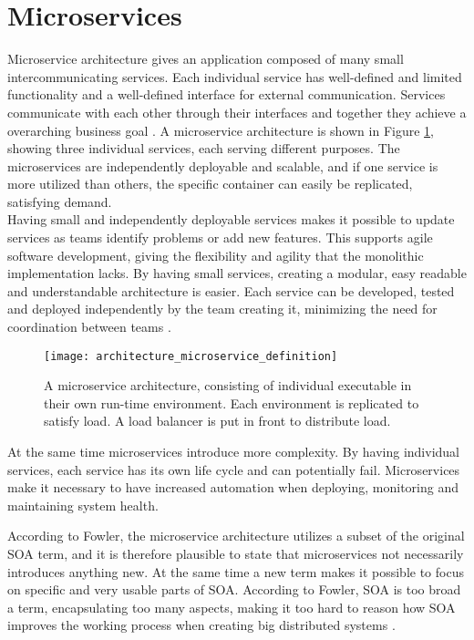 {\section{Microservices}
\label{sec:microservices}
Microservice architecture gives an application composed of many small intercommunicating services. Each individual service has well-defined and limited functionality and a well-defined interface for external communication. Services communicate with each other through their interfaces and together they achieve a overarching business goal \cite[p.~2]{newman2015microservices}. A microservice architecture is shown in Figure \ref{fig:architecture_microservice_definition}, showing three individual services, each serving different purposes. The microservices are independently deployable and scalable, and if one service is more utilized than others, the specific container can easily be replicated, satisfying demand. \\

Having small and independently deployable services makes it possible to update services as teams identify problems or add new features. This supports agile software development, giving the flexibility and agility that the monolithic implementation lacks. By having small services, creating a modular, easy readable and understandable architecture is easier. Each service can be developed, tested and deployed independently by the team creating it, minimizing the need for coordination between teams \cite{kniberg2014spotify}.

\begin{figure}[!htb]
\begin{center}
  \texttt{[image: architecture\_microservice\_definition]}  
  \caption{A microservice architecture, consisting of individual executable in their own run-time environment. Each environment is replicated to satisfy load. A load balancer is put in front to distribute load.}
  \label{fig:architecture_microservice_definition}
  \end{center}
\end{figure}

At the same time microservices introduce more complexity. By having individual services, each service has its own life cycle and can potentially fail. Microservices make it necessary to have increased automation when deploying, monitoring and maintaining system health\cite{meshenberg2016microservices}.

According to Fowler, the microservice architecture utilizes a subset of the original SOA term, and it is therefore plausible to state that microservices not necessarily introduces anything new. At the same time a new term makes it possible to focus on specific and very usable parts of SOA. According to Fowler, SOA is too broad a term, encapsulating too many aspects, making it too hard to reason how SOA improves the working process when creating big distributed systems \cite[t.~13:22]{fowler2014microservicesoamonolith}.

}

